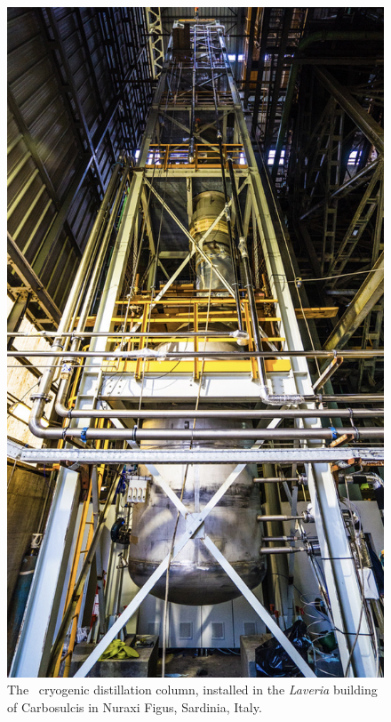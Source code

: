 \begin{figure}[!t]
\centering
\includegraphics[height=0.95\textheight]{./Figures/Aria.png}
\caption[The \SeruciZero\ cryogenic distillation column]{The \SeruciZero\ cryogenic distillation column, installed in the {\it Laveria} building of Carbosulcis in Nuraxi Figus, Sardinia, Italy.}
\label{fig:SeruciZero}
\end{figure}

